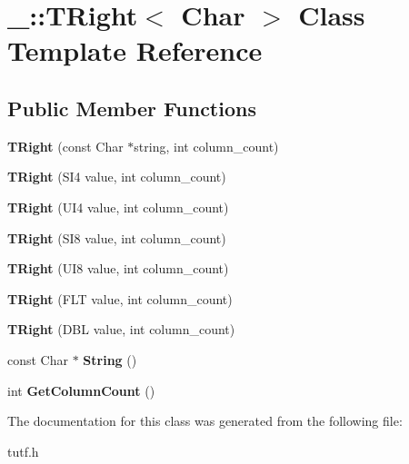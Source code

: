 \hypertarget{class___1_1_t_right}{}\section{\+\_\+\+:\+:T\+Right$<$ Char $>$ Class Template Reference}
\label{class___1_1_t_right}
\subsection*{Public Member Functions}
\begin{DoxyCompactItemize}
\item 
\mbox{\label{class___1_1_t_right_a05b7b633ef1e7930d94ea45b85e1f846}} 
{\bfseries T\+Right} (const Char $\ast$string, int column\+\_\+count)
\item 
\mbox{\label{class___1_1_t_right_afe816ae4779b9d9029caf02f51fc9072}} 
{\bfseries T\+Right} (S\+I4 value, int column\+\_\+count)
\item 
\mbox{\label{class___1_1_t_right_a7a65c4473fef0f1e430af4e59469be9a}} 
{\bfseries T\+Right} (U\+I4 value, int column\+\_\+count)
\item 
\mbox{\label{class___1_1_t_right_a76249e397a5e6beaef6f2fb94f0b1880}} 
{\bfseries T\+Right} (S\+I8 value, int column\+\_\+count)
\item 
\mbox{\label{class___1_1_t_right_a125675b236ecb73098e8ca1a86074548}} 
{\bfseries T\+Right} (U\+I8 value, int column\+\_\+count)
\item 
\mbox{\label{class___1_1_t_right_a5ec20d43ef43f0409c07f5ae8f326677}} 
{\bfseries T\+Right} (F\+LT value, int column\+\_\+count)
\item 
\mbox{\label{class___1_1_t_right_af88222306339a29324e5c83cef14e41d}} 
{\bfseries T\+Right} (D\+BL value, int column\+\_\+count)
\item 
\mbox{\label{class___1_1_t_right_ab2033b3a057b857513914407e0657b4a}} 
const Char $\ast$ {\bfseries String} ()
\item 
\mbox{\label{class___1_1_t_right_a6b5d836ab8db39b3493dfd2eeadfd898}} 
int {\bfseries Get\+Column\+Count} ()
\end{DoxyCompactItemize}


The documentation for this class was generated from the following file\+:\begin{DoxyCompactItemize}
\item 
tutf.\+h\end{DoxyCompactItemize}

